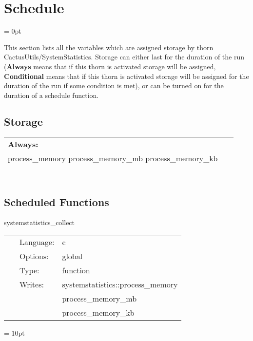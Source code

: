 \documentclass{article}
\begin{document}
\section{Schedule} 


\parskip = 0pt


\noindent This section lists all the variables which are assigned storage by thorn CactusUtils/SystemStatistics.  Storage can either last for the duration of the run ({\bf Always} means that if this thorn is activated storage will be assigned, {\bf Conditional} means that if this thorn is activated storage will be assigned for the duration of the run if some condition is met), or can be turned on for the duration of a schedule function.


\subsection*{Storage}

\hspace{5mm}

 \begin{tabular*}{160mm}{ll} 

{\bf Always:}&  ~ \\ 
 process\_memory process\_memory\_mb process\_memory\_kb & ~\\ 
~ & ~\\ 
\end{tabular*} 


\subsection*{Scheduled Functions}
\vspace{5mm}


\hspace{5mm} systemstatistics\_collect 

\hspace{5mm}{\it collect system statistics } 


\hspace{5mm}

 \begin{tabular*}{160mm}{cll} 
~ & Language:  & c \\ 
~ & Options:  & global \\ 
~ & Type:  & function \\ 
~ & Writes:  & systemstatistics::process\_memory \\ 
~& ~ &process\_memory\_mb\\ 
~& ~ &process\_memory\_kb\\ 
\end{tabular*} 



\vspace{5mm}\parskip = 10pt 
\end{document}
